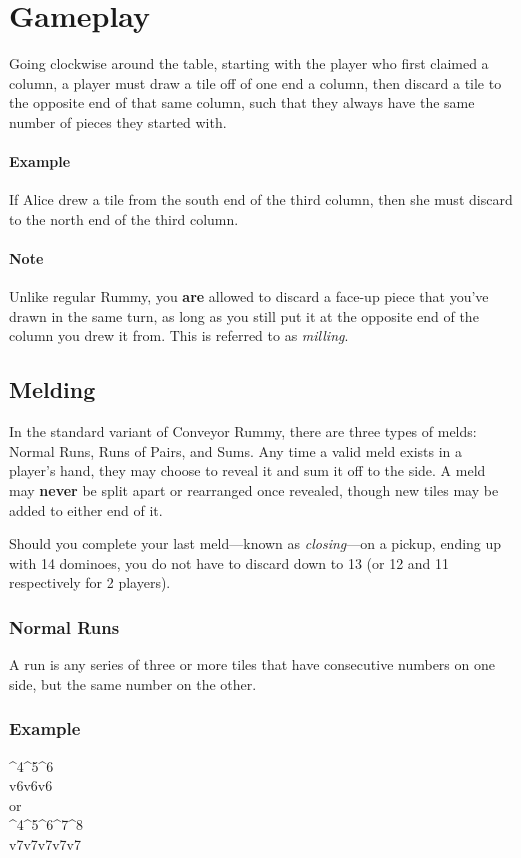 \section{Gameplay}
Going clockwise around the table, starting with the player who first claimed a column, a player must draw a tile off of one end a column, then discard a tile to the opposite end of that same column, such that they always have the same number of pieces they started with.

\paragraph{Example} If Alice drew a tile from the south end of the third column, then she must discard to the north end of the third column.

\paragraph{Note} Unlike regular Rummy, you \textbf{are} allowed to discard a face-up piece that you've drawn in the same turn, as long as you still put it at the opposite end of the column you drew it from. This is referred to as \textit{milling}.

\subsection{Melding}
In the standard variant of Conveyor Rummy, there are three types of melds: Normal Runs, Runs of Pairs, and Sums.
Any time a valid meld exists in a player's hand, they may choose to reveal it and sum it off to the side.
A meld may \textbf{never} be split apart or rearranged once revealed, though new tiles may be added to either end of it.

Should you complete your last meld---known as \textit{closing}---on a pickup, ending up with 14 dominoes, you do not have to discard down to 13 (or 12 and 11 respectively for 2 players).

\subsubsection{Normal Runs}
A run is any series of three or more tiles that have consecutive numbers on one side, but the same number on the other.

\subsubsection*{Example}
{\domino ^4^5^6\\v6v6v6}\vspace{1mm}\\
\vspace{1mm}or\\
{\domino ^4^5^6^7^8\\v7v7v7v7v7}

